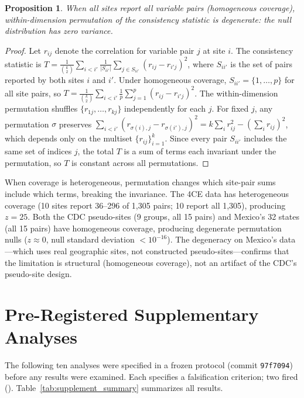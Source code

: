 \documentclass[11pt]{article}
\newtheorem{proposition}{Proposition}
\begin{document}
\begin{proposition}
When all sites report all variable pairs (homogeneous coverage), within-dimension permutation of the consistency statistic is degenerate: the null distribution has zero variance.
\end{proposition}

\begin{proof}
Let $r_{ij}$ denote the correlation for variable pair $j$ at site $i$.  The consistency statistic is $T = \frac{1}{\binom{k}{2}} \sum_{i < i'} \frac{1}{|S_{ii'}|} \sum_{j \in S_{ii'}} (r_{ij} - r_{i'j})^2$, where $S_{ii'}$ is the set of pairs reported by both sites $i$ and $i'$.
Under homogeneous coverage, $S_{ii'} = \{1, \ldots, p\}$ for all site pairs, so $T = \frac{1}{\binom{k}{2}} \sum_{i < i'} \frac{1}{p} \sum_{j=1}^{p} (r_{ij} - r_{i'j})^2$.
The within-dimension permutation shuffles $\{r_{1j}, \ldots, r_{kj}\}$ independently for each $j$.
For fixed $j$, any permutation $\sigma$ preserves $\sum_{i<i'} (r_{\sigma(i),j} - r_{\sigma(i'),j})^2 = k \sum_i r_{ij}^2 - (\sum_i r_{ij})^2$, which depends only on the multiset $\{r_{ij}\}_{i=1}^k$.
Since every pair $S_{ii'}$ includes the same set of indices $j$, the total $T$ is a sum of terms each invariant under the permutation, so $T$ is constant across all permutations.
\end{proof}

When coverage is heterogeneous, permutation changes which site-pair sums include which terms, breaking the invariance.  The 4CE data has heterogeneous coverage (10 sites report 36--296 of 1,305 pairs; 10 report all 1,305), producing $z = 25$.  Both the CDC pseudo-sites (9 groups, all 15 pairs) and Mexico's 32 states (all 15 pairs) have homogeneous coverage, producing degenerate permutation nulls ($z \approx 0$, null standard deviation $< 10^{-16}$).  The degeneracy on Mexico's data---which uses real geographic sites, not constructed pseudo-sites---confirms that the limitation is structural (homogeneous coverage), not an artifact of the CDC's pseudo-site design.

\section{Pre-Registered Supplementary Analyses}
\label{app:supplementary}

The following ten analyses were specified in a frozen protocol
(commit \texttt{97f7094}) before any results were examined.  Each
specifies a falsification criterion; two fired (\dag).
Table~\ref{tab:supplement_summary} summarizes all results.
\end{document}
